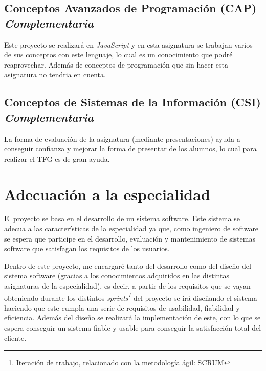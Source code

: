 \subsection{Conceptos Avanzados de Programación (CAP) \textit{Complementaria}}
Este proyecto se realizará en \textit{JavaScript} y en esta asignatura se trabajan varios de sus conceptos con este lenguaje, lo cual es un conocimiento que podré reaprovechar. Además de conceptos de programación que sin hacer esta asignatura no tendria en cuenta.
\subsection{Conceptos de Sistemas de la Información (CSI) \textit{Complementaria}}
La forma de evaluación de la asignatura (mediante presentaciones) ayuda a conseguir confianza y mejorar la forma de presentar de los alumnos, lo cual para realizar el TFG es de gran ayuda.
\clearpage
\section{Adecuación a la especialidad}
El proyecto se basa en el desarrollo de un sistema software. 
Este sistema se adecua a las características de la especialidad ya que, como ingeniero de software se espera que participe en el desarrollo, evaluación y mantenimiento de sistemas software que satisfagan los requisitos de los usuarios. 

Dentro de este proyecto, me encargaré tanto del desarrollo como del diseño del sistema software (gracias a los conocimientos adquiridos en las distintas asignaturas de la especialidad), es decir, a partir de los requisitos que se vayan obteniendo durante los distintos \textit{sprints\footnote{Iteración de trabajo, relacionado con la metodología ágil: SCRUM}} del proyecto se irá diseñando el sistema haciendo que este cumpla una serie de requisitos de usabilidad, fiabilidad y eficiencia. Además del diseño se realizará la implementación de este, con lo que se espera conseguir un sistema fiable y usable para conseguir la satisfacción total del cliente.
\clearpage
